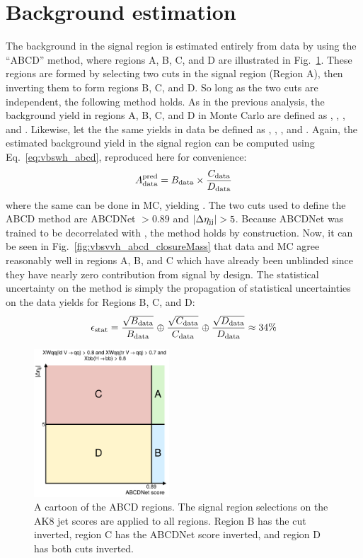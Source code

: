 \section{Background estimation}
The background in the signal region is estimated entirely from data by using the ``ABCD'' method, where regions A, B, C, and D are illustrated in Fig.~\ref{fig:vbsvvh_abcd}. %
These regions are formed by selecting two cuts in the signal region (Region A), then inverting them to form regions B, C, and D. 
So long as the two cuts are independent, the following method holds. 
As in the previous analysis, the background yield in regions A, B, C, and D in Monte Carlo are defined as \AMC, \BMC, \CMC, and \DMC.
Likewise, let the the same yields in data be defined as  \Adata, \Bdata, \Cdata, and \Ddata.
Again, the estimated background yield in the signal region \AdataPred can be computed using Eq.~\ref{eq:vbswh_abcd}, reproduced here for convenience:
\begin{equation*}
    A_{\text{data}}^{\text{pred}} = B_{\text{data}}\times\frac{C_{\text{data}}}{D_{\text{data}}}
\end{equation*}
where the same can be done in MC, yielding \AMCPred. 
The two cuts used to define the ABCD method are ABCDNet $> 0.89$ and $|\Delta\eta_{\mathrm{j}\mathrm{j}}| > 5$. 
Because ABCDNet was trained to be decorrelated with \detajj, the method holds by construction. 
Now, it can be seen in Fig.~\ref{fig:vbsvvh_abcd_closureMass} that data and MC agree reasonably well in regions A, B, and C which have already been unblinded since they have nearly zero contribution from signal by design. 
The statistical uncertainty \Estat on the method is simply the propagation of statistical uncertainties on the data yields for Regions B, C, and D:
\begin{equation}\label{eq:vbsvvh_statUnc}
    \Estat = \frac{\sqrt{\Bdata}}{\Bdata} \oplus \frac{\sqrt{\Cdata}}{\Cdata} \oplus \frac{\sqrt{\Ddata}}{\Ddata} \approx 34\% %
\end{equation}

\begin{figure}[htb]
    \centering
    \includegraphics[width=0.45\textwidth]{fig/vbsvvh/ABCD_abcdnet_score_gt_0p89_vs_abs_deta_jj_gt_5p0.pdf}
    \caption[A cartoon of the ABCD regions]{
        A cartoon of the ABCD regions. 
        The signal region selections on the AK8 jet \ParticleNet scores are applied to all regions. 
        Region B has the \detajj cut inverted, region C has the ABCDNet score inverted, and region D has both cuts inverted. 
    }
    \label{fig:vbsvvh_abcd}
\end{figure}

